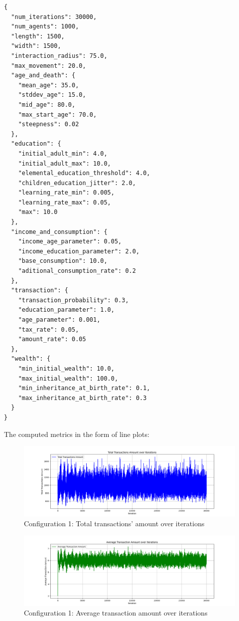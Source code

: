 \documentclass[english]{projectreport}
\begin{document}
    \begin{verbatim}
{
  "num_iterations": 30000,
  "num_agents": 1000,
  "length": 1500,
  "width": 1500,
  "interaction_radius": 75.0,
  "max_movement": 20.0,
  "age_and_death": {
    "mean_age": 35.0,
    "stddev_age": 15.0,
    "mid_age": 80.0,
    "max_start_age": 70.0,
    "steepness": 0.02
  },
  "education": {
    "initial_adult_min": 4.0,
    "initial_adult_max": 10.0,
    "elemental_education_threshold": 4.0,
    "children_education_jitter": 2.0,
    "learning_rate_min": 0.005,
    "learning_rate_max": 0.05,
    "max": 10.0
  },
  "income_and_consumption": {
    "income_age_parameter": 0.05,
    "income_education_parameter": 2.0,
    "base_consumption": 10.0,
    "aditional_consumption_rate": 0.2
  },
  "transaction": {
    "transaction_probability": 0.3,
    "education_parameter": 1.0,
    "age_parameter": 0.001,
    "tax_rate": 0.05,
    "amount_rate": 0.05
  },
  "wealth": {
    "min_initial_wealth": 10.0,
    "max_initial_wealth": 100.0,
    "min_inheritance_at_birth_rate": 0.1,
    "max_inheritance_at_birth_rate": 0.3
  }
}
    \end{verbatim}

    The computed metrics in the form of line plots:

    \begin{figure}[H]
        \centering
        \includegraphics[width=0.8\linewidth]{metrics_config1/metrics_config1_total_transactions_amount.png}
        \caption{Configuration 1: Total transactions' amount over iterations}
        \label{fig:c0-total_transactions_amount}
    \end{figure}

    \begin{figure}[H]
        \centering
        \includegraphics[width=0.8\linewidth]{metrics_config1/metrics_config1_average_transaction_amount.png}
        \caption{Configuration 1: Average transaction amount over iterations}
        \label{fig:c0-average_transaction_amount}
    \end{figure}
\end{document}
